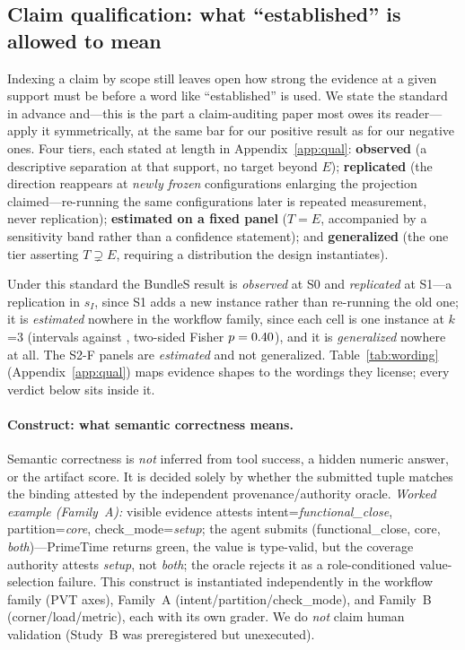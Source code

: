 \documentclass{article}
\begin{document}
\subsection{Claim qualification: what ``established'' is allowed to mean}
\label{sec:qual}
Indexing a claim by scope still leaves open how strong the evidence at a given support must be before a word like ``established'' is used. We state the standard in advance and---this is the part a claim-auditing paper most owes its reader---apply it symmetrically, at the same bar for our positive result as for our negative ones. Four tiers, each stated at length in Appendix~\ref{app:qual}: \textbf{observed} (a descriptive separation at that support, no target beyond $E$); \textbf{replicated} (the direction reappears at \emph{newly frozen} configurations enlarging the projection claimed---re-running the same configurations later is repeated measurement, never replication); \textbf{estimated on a fixed panel} ($T=E$, accompanied by a sensitivity band rather than a confidence statement); and \textbf{generalized} (the one tier asserting $T\supsetneq E$, requiring a distribution the design instantiates).

\noindent Under this standard the BundleS result is \emph{observed} at S0 and \emph{replicated} at S1---a replication in $s_I$, since S1 adds a new instance rather than re-running the old one; it is \emph{estimated} nowhere in the workflow family, since each cell is one instance at $k$=3 (intervals \StatSZeroTreatCI{} against \StatSZeroBaseCI{}, two-sided Fisher $p=0.40$), and it is \emph{generalized} nowhere at all. The S2-F panels are \emph{estimated} and not generalized. Table~\ref{tab:wording} (Appendix~\ref{app:qual}) maps evidence shapes to the wordings they license; every verdict below sits inside it.


\paragraph{Construct: what semantic correctness means.}
Semantic correctness is \emph{not} inferred from tool success, a hidden numeric answer, or the artifact score. It is decided solely by whether the submitted tuple matches the binding attested by the independent provenance/authority oracle. \emph{Worked example (Family~A):} visible evidence attests intent=\emph{functional\_close}, partition=\emph{core}, check\_mode=\emph{setup}; the agent submits (functional\_close, core, \emph{both})---PrimeTime returns green, the value is type-valid, but the coverage authority attests \emph{setup}, not \emph{both}; the oracle rejects it as a role-conditioned value-selection failure. This construct is instantiated independently in the workflow family (PVT axes), Family~A (intent/partition/check\_mode), and Family~B (corner/load/metric), each with its own grader. We do \emph{not} claim human validation (Study~B was preregistered but unexecuted).
\end{document}
